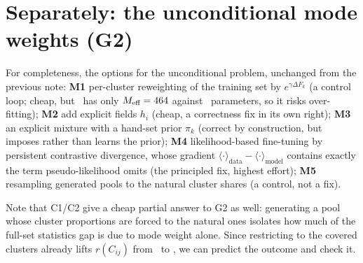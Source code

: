 \documentclass[10pt,a4paper]{article}
\begin{document}
\section{Separately: the unconditional mode weights (G2)}\label{sec:uncond}
For completeness, the options for the unconditional problem, unchanged from the previous note:
\textbf{M1} per-cluster reweighting of the training set by $e^{\gamma\Delta F_k}$ (a control loop;
cheap, but \MissCl\ has only $M_\text{eff}=464$ against \Nparams\ parameters, so it risks
over-fitting); \textbf{M2} add explicit fields $h_i$ (cheap, a correctness fix in its own right);
\textbf{M3} an explicit mixture with a hand-set prior $\pi_k$ (correct by construction, but imposes
rather than learns the prior); \textbf{M4} likelihood-based fine-tuning by persistent contrastive
divergence, whose gradient $\langle\cdot\rangle_{\text{data}}-\langle\cdot\rangle_{\text{model}}$
contains exactly the term pseudo-likelihood omits (the principled fix, highest effort);
\textbf{M5} resampling generated pools to the natural cluster shares (a control, not a fix).

Note that C1/C2 give a cheap partial answer to G2 as well: generating a pool whose cluster
proportions are forced to the natural ones isolates how much of the full-set statistics gap is due
to mode weight alone. Since restricting to the covered clusters already lifts $r(C_{ij})$ from
\rCOne\ to \rCcovOne, we can predict the outcome and check it.

\end{document}
